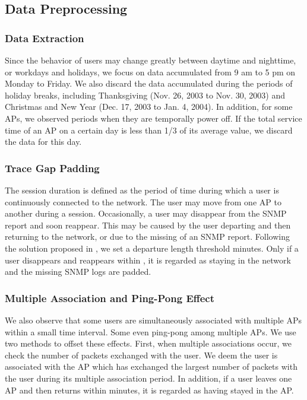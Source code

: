 \subsection{Data Preprocessing} \label{sec:preproc}
\subsubsection{Data Extraction}
Since the behavior of users may change greatly between daytime and nighttime, or workdays and holidays, we focus on data accumulated from 9 am to 5 pm on Monday to Friday. We also discard the data accumulated during the periods of holiday breaks, including Thanksgiving (Nov. 26, 2003 to Nov. 30, 2003) and Christmas and New Year (Dec. 17, 2003 to Jan. 4, 2004).
In addition, for some APs, we observed periods when they are temporally power off.  If the total service time of an AP on a certain day is less than 1/3 of its average value, we discard the data for this day.



\subsubsection{Trace Gap Padding}
The session duration is defined as the period of time during which a user is continuously connected to the network. The user may move from one AP to another during a session. Occasionally, a user may disappear from the SNMP report and soon reappear. This may be caused by the user departing and then returning to the network, or due to the missing of an SNMP report. Following the solution proposed in \cite{Mobility-Core1}, we set a departure length threshold  minutes. Only if a user disappears and reappears within , it is regarded as staying in the network and the missing SNMP logs are padded.

\subsubsection{Multiple Association and Ping-Pong Effect}
We also observe that some users are simultaneously associated with multiple APs within a small time interval.  Some even ping-pong among multiple APs.  We use two methods to offset these effects. First, when multiple associations occur, we check the number of packets exchanged with the user. We deem the user is associated with the AP which has exchanged the largest number of packets with the user during its multiple association period.  In addition, if a user leaves one AP and then returns within  minutes, it is regarded as having stayed in the AP.

